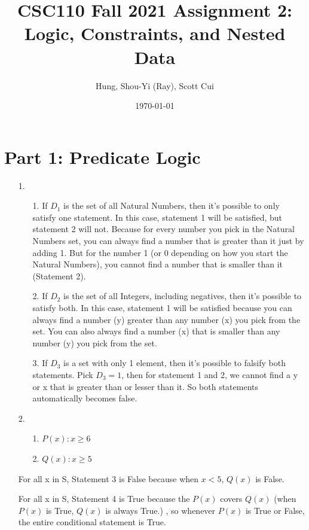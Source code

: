 \documentclass[fontsize=11pt]{article}
\title{CSC110 Fall 2021 Assignment 2: Logic, Constraints, and Nested Data}
\author{Hung, Shou-Yi (Ray), Scott Cui}
\date{\today}
\begin{document}
\maketitle

\section*{Part 1: Predicate Logic}

\begin{enumerate}

    \item[1.]
        \begin{enumerate}
            \item[1.] If $D_1$ is the set of all Natural Numbers, then it's possible to only satisfy one statement. In this case, statement 1 will be satisfied, but statement 2 will not. Because for every number you pick in the Natural Numbers set, you can always find a number that is greater than it just by adding 1. But for the number 1 (or 0 depending on how you start the Natural Numbers), you cannot find a number that is smaller than it (Statement 2).
            \item[2.] If $D_2$ is the set of all Integers, including negatives, then it's possible to satisfy both. In this case, statement 1 will be satisfied because you can always find a number (y) greater than any number (x) you pick from the set. You can also always find a number (x) that is smaller than any number (y) you pick from the set.
            \item[3.] If $D_3$ is a set with only 1 element, then it's possible to falsify both statements. Pick $D_3 = {1}$, then for statement 1 and 2, we cannot find a y or x that is greater than or lesser than it. So both statements automatically becomes false.
        \end{enumerate}

    \item[2.]
        \begin{enumerate}
            \item[1.] $P(x): x \ge 6$
            \item[2.] $Q(x): x \ge 5$
        \end{enumerate}
            For all x in S, Statement 3 is False because when $x < 5$, $Q(x)$ is False.

            For all x in S, Statement 4 is True because the $P(x)$ covers $Q(x)$
            (when $P(x)$ is True, $Q(x)$ is always True.)
            , so whenever $P(x)$ is True or False, the entire conditional statement is True.


\end{enumerate}
\end{document}
